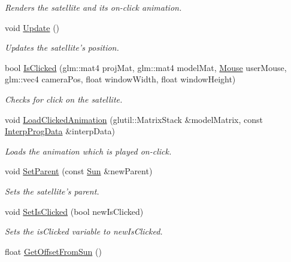 \begin{DoxyCompactItemize}
\begin{DoxyCompactList}\small\item\em Renders the satellite and its on-\/click animation. \end{DoxyCompactList}\item 
void \hyperlink{class_satellite_a9922529e27792578c7047bb91d27e21f}{Update} ()
\begin{DoxyCompactList}\small\item\em Updates the satellite's position. \end{DoxyCompactList}\item 
bool \hyperlink{class_satellite_a9701b3bb18389b93b70a75f17008d629}{Is\-Clicked} (glm\-::mat4 proj\-Mat, glm\-::mat4 model\-Mat, \hyperlink{class_mouse}{Mouse} user\-Mouse, glm\-::vec4 camera\-Pos, float window\-Width, float window\-Height)
\begin{DoxyCompactList}\small\item\em Checks for click on the satellite. \end{DoxyCompactList}\item 
\hypertarget{class_satellite_a511a833d667e6c52b417232abfa95e70}{void \hyperlink{class_satellite_a511a833d667e6c52b417232abfa95e70}{Load\-Clicked\-Animation} (glutil\-::\-Matrix\-Stack \&model\-Matrix, const \hyperlink{struct_interp_prog_data}{Interp\-Prog\-Data} \&interp\-Data)}\label{class_satellite_a511a833d667e6c52b417232abfa95e70}

\begin{DoxyCompactList}\small\item\em Loads the animation which is played on-\/click. \end{DoxyCompactList}\item 
\hypertarget{class_satellite_a84782cdb794e9c2d86966bfb0487d428}{void \hyperlink{class_satellite_a84782cdb794e9c2d86966bfb0487d428}{Set\-Parent} (const \hyperlink{class_sun}{Sun} \&new\-Parent)}\label{class_satellite_a84782cdb794e9c2d86966bfb0487d428}

\begin{DoxyCompactList}\small\item\em Sets the satellite's parent. \end{DoxyCompactList}\item 
\hypertarget{class_satellite_ae55915277ebb216b20c86895c9c4343e}{void \hyperlink{class_satellite_ae55915277ebb216b20c86895c9c4343e}{Set\-Is\-Clicked} (bool new\-Is\-Clicked)}\label{class_satellite_ae55915277ebb216b20c86895c9c4343e}

\begin{DoxyCompactList}\small\item\em Sets the is\-Clicked variable to new\-Is\-Clicked. \end{DoxyCompactList}\item 
\hypertarget{class_satellite_af93a0103317331a898adf8923a547d7f}{float \hyperlink{class_satellite_af93a0103317331a898adf8923a547d7f}{Get\-Offset\-From\-Sun} ()}\label{class_satellite_af93a0103317331a898adf8923a547d7f}


\end{DoxyCompactItemize}
